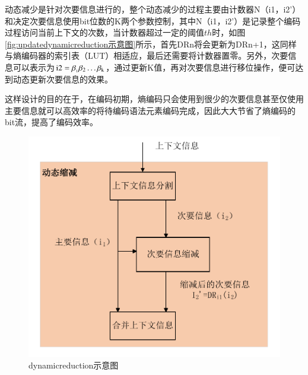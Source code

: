 \documentclass[bachelor,print,msfonts]{xduthesis}
\begin{document}
动态减少是针对次要信息进行的，整个动态减少的过程主要由计数器N（i1，i2’）和决定次要信息使用bit位数的K两个参数控制，其中N（i1，i2’）是记录整个编码过程访问当前上下文的次数，当计数器超过一定的阈值$th$时，如图\ref{fig:updatedynamicreduction示意图}所示，首先DRn将会更新为DRn+1，这同样与熵编码器的索引表（LUT）相适应，最后还需要将计数器置零。另外，次要信息可以表示为${\rm{i}}2 = {\beta _{_1}}{\beta _2} \ldots {\beta _{\rm{k}}}$，通过更新K值，再对次要信息进行移位操作，便可达到动态更新次要信息的效果。

这样设计的目的在于，在编码初期，熵编码只会使用到很少的次要信息甚至仅使用主要信息就可以高效率的将待编码语法元素编码完成，因此大大节省了熵编码的bit流，提高了编码效率。
\begin{figure}[htb]
    \centering
    \includegraphics[scale=0.4]{image/动态缩减_crop.pdf}
    \caption{dynamicreduction示意图}
    \label{fig:dynamicreduction示意图}
\end{figure}
\end{document}
